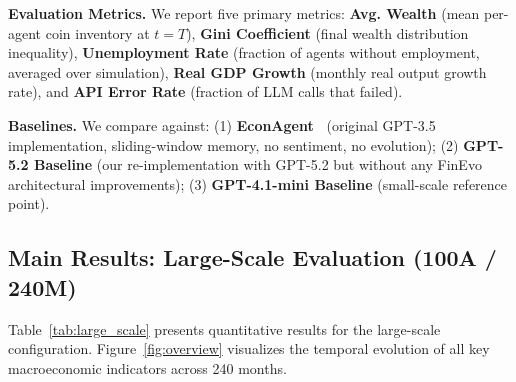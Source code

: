 \noindent\textbf{Evaluation Metrics.}
We report five primary metrics: \textbf{Avg. Wealth} (mean per-agent coin inventory at $t=T$), \textbf{Gini Coefficient} (final wealth distribution inequality), \textbf{Unemployment Rate} (fraction of agents without employment, averaged over simulation), \textbf{Real GDP Growth} (monthly real output growth rate), and \textbf{API Error Rate} (fraction of LLM calls that failed).

\noindent\textbf{Baselines.}
We compare against: (1) \textbf{EconAgent~\cite{li2024econagent}} (original GPT-3.5 implementation, sliding-window memory, no sentiment, no evolution); (2) \textbf{GPT-5.2 Baseline} (our re-implementation with GPT-5.2 but without any FinEvo architectural improvements); (3) \textbf{GPT-4.1-mini Baseline} (small-scale reference point).

\subsection{Main Results: Large-Scale Evaluation (100A / 240M)}
\label{sec:main_results}

Table~\ref{tab:large_scale} presents quantitative results for the large-scale configuration. Figure~\ref{fig:overview} visualizes the temporal evolution of all key macroeconomic indicators across 240 months.

